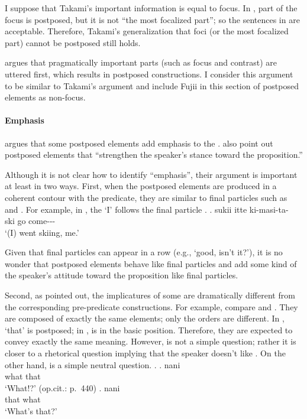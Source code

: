 I suppose that Takami's important information is equal to focus.
In \Last, part of the focus is postposed,
but it is not ``the most focalized part'';
so the sentences in \Last are acceptable.
Therefore,
Takami's generalization that foci (or the most focalized part) cannot be postposed still holds.

 argues that pragmatically important parts (such as focus and contrast) are uttered first,
which results in postposed constructions.
I consider this argument to be similar to Takami's argument and
include Fujii in this section of postposed elements as non-focus.


\paragraph{Emphasis}

 argues that some postposed elements add emphasis to the .
 also point out postposed elements that
``strengthen the speaker's stance toward the proposition.''

Although it is not clear how to identify ``emphasis'',
their argument is important at least in two ways.
First,
when the postposed elements are produced in a coherent contour with the predicate,
they are similar to final particles such as  and .
For example, in \Next,
the   `I' follows the final particle .
%
\exg. sukii itte ki-masi-ta-  \\
      ski go come---  \\
      `(I) went skiing, me.'
      \hfill{\cite[438]{onosuzuki92}}

Given that final particles can appear in a row (e.g.,  `good, isn't it?'),
it is no wonder that postposed elements behave like final particles
and add some kind of the speaker's attitude toward the proposition like final particles.

Second,
as  pointed out,
the implicatures of some  are dramatically different from the corresponding pre-pred\-i\-cate constructions.%
For example, compare \Next[a] and \Next[b].
They are composed of exactly the same elements;
only the orders are different.
In \Next[a],  `that' is postposed;
in \Next[b],  is in the basic position.
Therefore, they are expected to convey exactly the same meaning.
However, \Next[a] is not a simple question;
rather it is closer to a rhetorical question implying that the speaker doesn't like .
On the other hand, \Next[b] is a simple neutral question.
%
\ex.
 \ag. nani  \\
      what that \\
      `What!?'
      \hfill{(op.cit.: p.~440)}
 \bg.  nani \\
       that what \\
       `What's that?'


